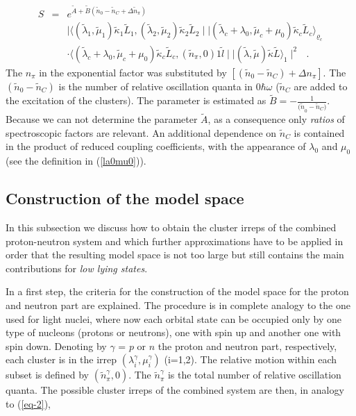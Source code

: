 \documentclass[12pt]{article}
\newcommand{\beqa}{\begin{eqnarray}}
\newcommand{\eeqa}{\end{eqnarray}}
\begin{document}
\beqa
S & = & e^{{\tilde A} 
+ {\tilde B} ({\tilde n}_0-{\tilde n}_C+\Delta {\tilde n}_\pi )}
\nonumber \\
&&
\mid 
\langle ({\tilde \lambda}_1,{\tilde \mu}_1)
{\tilde \kappa}_1{\tilde L}_1, 
({\tilde \lambda}_2,{\tilde \mu}_2)
{\tilde \kappa}_2{\tilde L}_2 \mid\mid
({\tilde \lambda}_c+\lambda_0,{\tilde \mu}_c+\mu_0){\tilde \kappa}_c
{\tilde L}_c \rangle_{\varrho_c}
\nonumber \\
&& \cdot
\langle ({\tilde \lambda}_c+\lambda_0,{\tilde \mu}_c+\mu_0)
{\tilde \kappa}_c{\tilde L}_c, 
({\tilde n}_\pi ,0)1{\tilde l} \mid\mid
({\tilde \lambda} ,{\tilde \mu} ){\tilde \kappa} 
{\tilde L} \rangle_1
\mid^2
~~~.
\label{specfac-heavy}
\eeqa 
The $n_\pi$ in the exponential factor was substituted
by $[(\tilde{n}_0-\tilde{n}_C)+\Delta n_\pi ]$. The $({\tilde n}_0-{\tilde n}_C)$ is the
number of relative oscillation quanta in $0\hbar\omega$ ($\tilde{n}_C$ are added to
the excitation of the clusters).
The parameter is estimated as 
${\tilde B}=-\frac{1}{{(\tilde n}_0-\tilde{n}_C)}$. Because we can not determine
the parameter ${\tilde A}$, as a consequence 
only {\it ratios} of spectroscopic factors are relevant.
An additional dependence on $\tilde{n}_C$ is contained in the product of 
reduced coupling coefficients, with the appearance of $\lambda_0$
and $\mu_0$ (see the definition in (\ref{la0mu0})). 

\subsection{Construction of the model space}
\label{sub-3.3}

In this subsection we discuss how to obtain the cluster irreps of the 
combined proton-neutron system and which further approximations have to be applied in
order that the resulting model space is not too large but still contains the
main contributions for {\it low lying states}.

In a first step, the criteria for the construction of the model space for the proton and 
neutron part are explained. The procedure is in complete analogy to the one used for
light nuclei, where now each orbital state can be occupied only by one type of nucleons 
(protons or neutrons), one with spin up and another one with spin down. Denoting by $\gamma$
= $p$ or $n$ the proton and neutron part, respectively, each cluster is in the irrep
$\left( \lambda^{\gamma}_i,\mu^{\gamma}_i\right)$ (i=1,2).
The relative motion within each subset is defined by $\left(\tilde{n}^\gamma_\pi , 0\right)$.
The ${\tilde n}^\gamma_\pi$ is the total number of relative oscillation quanta. 
The possible cluster irreps of the combined system are then, in analogy to (\ref{eq-2}), 
\end{document}
